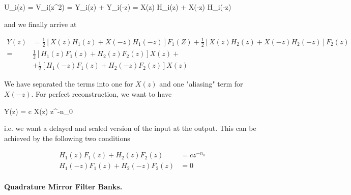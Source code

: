 \bee
U_i(z) = V_i(z^2) =  Y_i(z) +  Y_i(-z) =  X(z) H_i(z) +  X(-z) H_i(-z)
\eee

and we finally arrive at

\begin{align*}
Y(z) &= \frac{1}{2} \left[  X(z) H_1(z) + X(-z) H_1(-z) \right]  F_1(Z) + \frac{1}{2} \left[ X(z) H_2(z) +  X(-z) H_2(-z) \right] F_2(z) \\
= &\frac{1}{2} \left[ H_1(z) F_1(z) + H_2(z) F_2(z) \right] X(z) + \\
&+ \frac{1}{2} \left[ H_1(-z) F_1(z) + H_2(-z) F_2(z) \right] X(z)
\end{align*}

We have separated the terms into one for $X(z)$ and one "aliasing" term for $X(-z)$. For perfect reconstruction, we want to have

\bee
Y(z) = c X(z) z^{-n_0}
\eee

i.e. we want a delayed and scaled version of the input at the output. This can be achieved by the following two conditions

\begin{align*}
H_1(z) F_1(z) + H_2(z) F_2(z) &= c z^{-n_0} \\
H_1(-z) F_1(z) + H_2(-z) F_2(z) &= 0
\end{align*}


\paragraph{Quadrature Mirror Filter Banks.}




